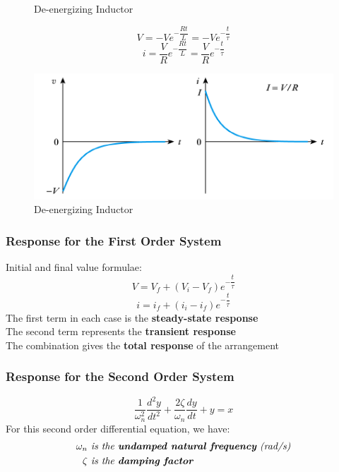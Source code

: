 \documentclass[UTF8]{article}
\begin{document}
\begin{itemize}
\begin{figure}[H]
\caption{De-energizing Inductor}
\end{figure}
$$V=-Ve^{-\dfrac{Rt}{L}}=-Ve^{-\dfrac{t}{\tau}}$$
$$i=\dfrac{V}{R}e^{-\dfrac{Rt}{L}}=\dfrac{V}{R}e^{-\dfrac{t}{\tau}}$$
\begin{figure}[H]
\centering
\includegraphics[scale=0.9]{b4.PNG}
\caption{De-energizing Inductor}
\end{figure}
\end{itemize}

\subsubsection{Response for the First Order System}
Initial and final value formulae:
$$V=V_f+(V_i-V_f)e^{-\dfrac{t}{\tau}}$$
$$i=i_f+(i_i-i_f)e^{-\dfrac{t}{\tau}}$$
 {The first term in each case is the \textbf{steady-state response}}\\
 {The second term represents the \textbf{transient response}}\\
 {The combination gives the \textbf{total response} of the arrangement}

\subsubsection{Response for the Second Order System}
$$\dfrac{1}{\omega _n^2}\dfrac{d^2y}{dt^2}+\dfrac{2\zeta }{\omega _n}\dfrac{dy}{dt}+y=x$$
 {For this second order differential equation, we have:}
\begin{align*}
\omega _n & \textit{ is the \textbf{undamped natural frequency} (rad/s)}\\
\zeta & \textit{ is the \textbf{damping factor}}
\end{align*}
\end{document}

